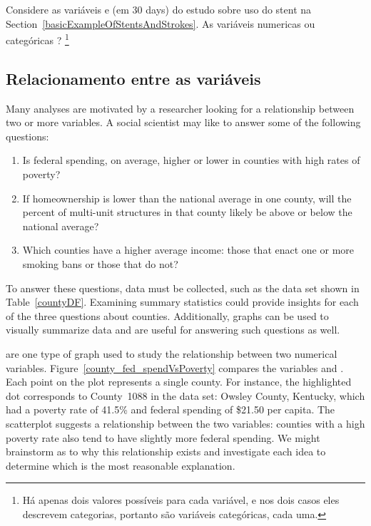 \begin{exercise} 
Considere as variáveis  e  (em 30 days) do estudo sobre uso do stent na Section~\ref{basicExampleOfStentsAndStrokes}. As variáveis numericas ou categóricas ? \footnote{Há apenas dois valores possíveis para cada variável, e nos dois casos eles descrevem categorias, portanto são variáveis categóricas, cada uma.}
\end{exercise}

\subsection{Relacionamento entre as variáveis}
\label{variableRelations}

Many analyses are motivated by a researcher looking for a relationship between two or more variables. A social scientist may like to answer some of the following questions:
\begin{enumerate}
\setlength{\itemsep}{0mm}
\item[(1)]\label{fedSpendingPovertyQuestion} Is federal spending, on average, higher or lower in counties with high rates of poverty?
\item[(2)]\label{ownershipMultiUnitQuestion} If homeownership is lower than the national average in one county, will the percent of multi-unit structures in that county likely be above or below the national average?
\item[(3)]\label{isAverageIncomeAssociatedWithSmokingBans} Which counties have a higher average income: those that enact one or more smoking bans or those that do not?
\end{enumerate}

To answer these questions, data must be collected, such as the  data set shown in Table~\ref{countyDF}. Examining summary statistics  could provide insights for each of the three questions about counties. Additionally, graphs can be used to visually summarize data and are useful for answering such questions as well.

 are one type of graph used to study the relationship between two numerical variables. Figure~\ref{county_fed_spendVsPoverty} compares the variables  and . Each point on the plot represents a single county. For instance, the highlighted dot corresponds to County~1088 in the  data set: Owsley County, Kentucky, which had a poverty rate of 41.5\% and federal spending of \$21.50 per capita. The scatterplot suggests a relationship between the two variables: counties with a high poverty rate also tend to have slightly more federal spending. We might brainstorm as to why this relationship exists and investigate each idea to determine which is the most reasonable explanation.


